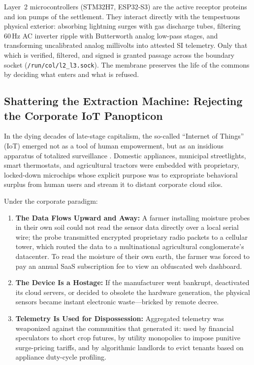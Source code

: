 Layer~2 microcontrollers (STM32H7, ESP32-S3) are the active receptor proteins and ion pumps of the settlement. They interact directly with the tempestuous physical exterior: absorbing lightning surges with gas discharge tubes, filtering $60\,\mathrm{Hz}$ AC inverter ripple with Butterworth analog low-pass stages, and transforming uncalibrated analog millivolts into attested SI telemetry. Only that which is verified, filtered, and signed is granted passage across the boundary socket (\texttt{/run/col/l2\_l3.sock}). The membrane preserves the life of the commons by deciding what enters and what is refused.

\subsection{Shattering the Extraction Machine: Rejecting the Corporate IoT Panopticon}

In the dying decades of late-stage capitalism, the so-called ``Internet of Things'' (IoT) emerged not as a tool of human empowerment, but as an insidious apparatus of totalized surveillance \parencite{zuboff2019}. Domestic appliances, municipal streetlights, smart thermostats, and agricultural tractors were embedded with proprietary, locked-down microchips whose explicit purpose was to expropriate behavioral surplus from human users and stream it to distant corporate cloud silos.

Under the corporate paradigm:
\begin{enumerate}
    \item \textbf{The Data Flows Upward and Away:} A farmer installing moisture probes in their own soil could not read the sensor data directly over a local serial wire; the probe transmitted encrypted proprietary radio packets to a cellular tower, which routed the data to a multinational agricultural conglomerate's datacenter. To read the moisture of their own earth, the farmer was forced to pay an annual SaaS subscription fee to view an obfuscated web dashboard.
    \item \textbf{The Device Is a Hostage:} If the manufacturer went bankrupt, deactivated its cloud servers, or decided to obsolete the hardware generation, the physical sensors became instant electronic waste---bricked by remote decree.
    \item \textbf{Telemetry Is Used for Dispossession:} Aggregated telemetry was weaponized against the communities that generated it: used by financial speculators to short crop futures, by utility monopolies to impose punitive surge-pricing tariffs, and by algorithmic landlords to evict tenants based on appliance duty-cycle profiling.
\end{enumerate}

